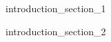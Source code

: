 \chaptertoc{}

\label{sec:int_01}
{introduction_section_1}

\label{sec:int_02}
{introduction_section_2}